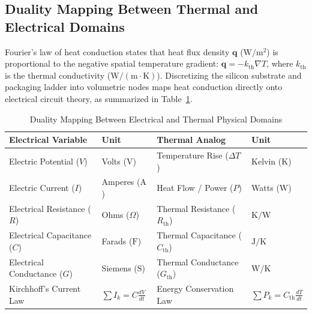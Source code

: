 \subsection{Duality Mapping Between Thermal and Electrical Domains}

Fourier's law of heat conduction states that heat flux density $\mathbf{q}$ ($\mathrm{W/m^2}$) is proportional to the negative spatial temperature gradient: $\mathbf{q} = -k_{\mathrm{th}} \nabla T$, where $k_{\mathrm{th}}$ is the thermal conductivity ($\mathrm{W/(m\cdot K)}$). Discretizing the silicon substrate and packaging ladder into volumetric nodes maps heat conduction directly onto electrical circuit theory, as summarized in Table~\ref{tab:electro-thermal-duality}.

\begin{table}[ht]
\caption{Duality Mapping Between Electrical and Thermal Physical Domains}
\label{tab:electro-thermal-duality}
\centering
\begin{tabular}{p{3.5cm}p{2.2cm}p{4.2cm}p{2.2cm}}
\hline
\textbf{Electrical Variable} & \textbf{Unit} & \textbf{Thermal Analog} & \textbf{Unit} \\
\hline
Electric Potential ($V$) & Volts ($\mathrm{V}$) & Temperature Rise ($\Delta T$) & Kelvin ($\mathrm{K}$) \\
Electric Current ($I$) & Amperes ($\mathrm{A}$) & Heat Flow / Power ($P$) & Watts ($\mathrm{W}$) \\
Electrical Resistance ($R$) & Ohms ($\Omega$) & Thermal Resistance ($R_{\mathrm{th}}$) & $\mathrm{K/W}$ \\
Electrical Capacitance ($C$) & Farads ($\mathrm{F}$) & Thermal Capacitance ($C_{\mathrm{th}}$) & $\mathrm{J/K}$ \\
Electrical Conductance ($G$) & Siemens ($\mathrm{S}$) & Thermal Conductance ($G_{\mathrm{th}}$) & $\mathrm{W/K}$ \\
Kirchhoff's Current Law & $\sum I_k = C \frac{dV}{dt}$ & Energy Conservation Law & $\sum P_k = C_{\mathrm{th}} \frac{dT}{dt}$ \\
\hline
\end{tabular}
\end{table}


